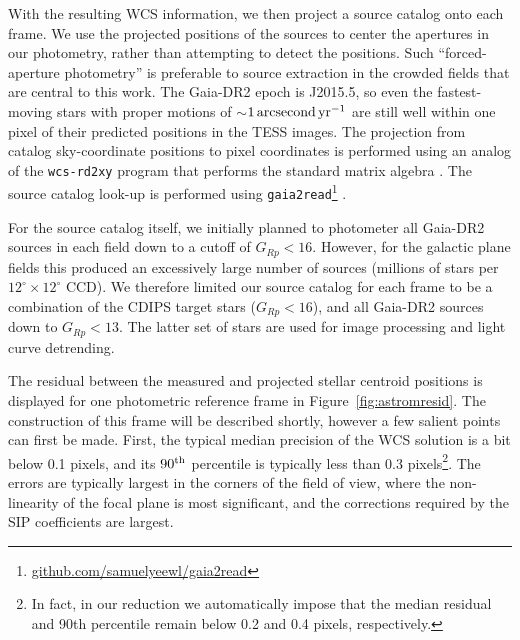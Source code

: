 \documentclass[12pt,twocolumn,tighten]{aastex62}
\begin{document}
With the resulting WCS information, we then project a source catalog
onto each frame. 
We use the
projected positions of the sources to center the apertures in our
photometry,
rather than attempting to detect the positions.  Such
``forced-aperture photometry'' is preferable to source
extraction in the crowded fields that are central to this work.  The
Gaia-DR2 epoch is J2015.5, so even the fastest-moving stars with
proper motions of $\sim$$1\,{\rm arcsecond}\,{\rm yr}^{-1}$ are still
well within one pixel of their predicted positions in the TESS images.
The projection from catalog sky-coordinate positions to pixel
coordinates is performed using an analog of the \texttt{wcs-rd2xy}
program that performs the standard matrix algebra \citep{lang_2010}.
The source catalog look-up is performed using
\texttt{gaia2read}\footnote{\url{github.com/samuelyeewl/gaia2read}}
\citep{kim_2018_gaia2read}.

For the source catalog itself, we initially planned to photometer all Gaia-DR2
sources in each field down to a cutoff of $G_{Rp} < 16$.  However,
for the galactic plane fields this produced an excessively
large number of sources (millions of stars per
$12^\circ\times12^\circ$ CCD).  We therefore limited our source
catalog for each frame to be
a combination of the CDIPS target stars ($G_{Rp} < 16$), and
all Gaia-DR2 sources down to $G_{Rp} < 13$.  
The latter set of stars are used for image processing and
light curve detrending.

The residual between the measured and projected stellar centroid
positions is displayed for one photometric reference frame in
Figure~\ref{fig:astromresid}.
The construction of this frame will be described shortly, however
a few salient points can first be made.
First, the typical median precision of the WCS solution is a bit below
0.1 pixels, and its $90^{\rm th}$ percentile is typically less than
0.3 pixels\footnote{In fact, in our reduction we automatically impose
that the median residual and 90th percentile remain below 0.2 and 0.4
pixels, respectively.}.
The errors are typically largest in the corners of the field of view,
where the non-linearity of the focal plane is most significant, and
the corrections required by the SIP coefficients are largest.
\end{document}
